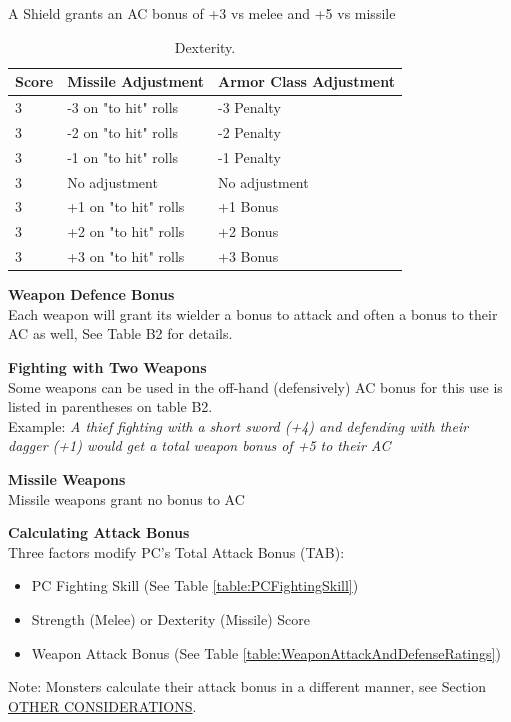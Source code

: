 \documentclass[letterpaper,sansserif,tightsqueeze]{rpg-module}
\begin{document}
A Shield grants an AC bonus of +3 vs melee and +5 vs missile

\begin{table}[h!]
	\centering
	\begin{tabular}{|l|l|l|}
		\hline
		\textbf{Score}	& \textbf{Missile Adjustment}	& \textbf{Armor Class Adjustment} 	\\ \hline
		3		& -3 on "to hit" rolls	& -3 Penalty				\\ \hline
		3		& -2 on "to hit" rolls	& -2 Penalty				\\ \hline
		3		& -1 on "to hit" rolls	& -1 Penalty				\\ \hline
		3		& No adjustment			& No adjustment				\\ \hline
		3		& +1 on "to hit" rolls	& +1 Bonus					\\ \hline
		3		& +2 on "to hit" rolls	& +2 Bonus					\\ \hline
		3		& +3 on "to hit" rolls	& +3 Bonus					\\ \hline
	\end{tabular}
	\caption{Dexterity.}
	\label{table:Dexterity}
\end{table}

\textbf{Weapon Defence Bonus}\\
Each weapon will grant its wielder a bonus to attack and often a bonus to their AC as well, See Table B2 for details.

\textbf{Fighting with Two Weapons}\\
Some weapons can be used in the off-hand (defensively) AC bonus for this use is listed in parentheses on table B2.\\
Example: \textit{A thief fighting with a short sword (+4) and defending with their dagger (+1) would get a total weapon bonus of +5 to their AC}

\textbf{Missile Weapons}\\
Missile weapons grant no bonus to AC

\textbf{Calculating Attack Bonus}\\
Three factors modify PC’s Total Attack Bonus (TAB):
\begin{itemize}
	\item PC Fighting Skill (See Table \ref{table:PCFightingSkill})
	\item Strength (Melee) or Dexterity (Missile) Score
	\item Weapon Attack Bonus (See Table \ref{table:WeaponAttackAndDefenseRatings})
\end{itemize}
Note: Monsters calculate their attack bonus in a different manner, see Section \hyperref[subsection:MonsterAC]{OTHER CONSIDERATIONS}.
\end{document}
